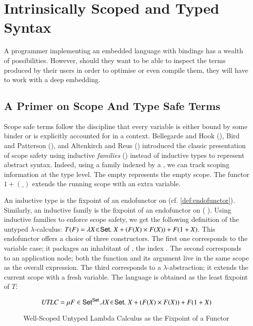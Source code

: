 \chapter{Intrinsically Scoped and Typed Syntax}
\label{sec:scopedtypedterms}

A programmer implementing an embedded language with bindings has a wealth of
possibilities. However, should they want to be able to inspect the terms produced
by their users in order to optimise or even compile them, they will have to work
with a deep embedding.

\section{A Primer on Scope And Type Safe Terms}\label{section:primer-term}

Scope safe terms follow the discipline that every variable is either bound by
some binder or is explicitly accounted for in a context. Bellegarde and Hook
(\citeyear{BELLEGARDE1994287}), Bird and Patterson (\citeyear{bird_paterson_1999}),
and Altenkirch and Reus (\citeyear{altenkirch1999monadic}) introduced the classic
presentation of scope safety using inductive \emph{families}
(\cite{dybjer1994inductive}) instead of inductive types to represent abstract
syntax. Indeed, using a family indexed by a , we can track scoping
information at the type level. The empty  represents the empty scope.
The functor $1 + (\_)$ extends the running scope with an extra variable.

An inductive type is the fixpoint of an endofunctor on 
(cf. \cref{def:endofunctor}). Similarly, an
inductive family is the fixpoint of an endofunctor on ({  }).
Using inductive families to enforce scope safety, we get the following definition
of the untyped $\lambda$-calculus:
$T(F) = \lambda X \!\in\! \AD{Set}.\; X + (F(X) \times F(X)) + F(1 + X)$.
This endofunctor offers a choice of three constructors.  The first one corresponds
to the variable case; it packages an inhabitant of , the index .
The second corresponds to an application node; both the function and its argument
live in the same scope as the overall expression. The third corresponds to a
$\lambda$-abstraction; it extends the current scope with a fresh variable.
The language is obtained as the least fixpoint of $T$:

\begin{figure}[h]
\[
   \mathit{UTLC} = \mu F \in \AD{Set}^{\AD{Set}}.
   \lambda X \!\in\! \AD{Set}.\; X + (F(X) \times F(X)) + F(1 + X)
\]
\caption{Well-Scoped Untyped Lambda Calculus as the Fixpoint of a Functor}
\end{figure}

